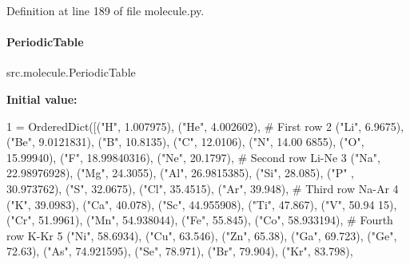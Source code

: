 Definition at line 189 of file molecule.\+py.

\mbox{\label{namespacesrc_1_1molecule_a9104a499383cefd53789d767a08472b3}} 
\paragraph{\texorpdfstring{Periodic\+Table}{PeriodicTable}}
{\footnotesize\ttfamily src.\+molecule.\+Periodic\+Table}

{\bfseries Initial value\+:}
\begin{DoxyCode}
1 =  OrderedDict([(\textcolor{stringliteral}{"H"}, 1.007975), (\textcolor{stringliteral}{"He"}, 4.002602), \textcolor{comment}{# First row}
2                              (\textcolor{stringliteral}{"Li"}, 6.9675), (\textcolor{stringliteral}{"Be"}, 9.0121831), (\textcolor{stringliteral}{"B"}, 10.8135), (\textcolor{stringliteral}{"C"}, 12.0106), (\textcolor{stringliteral}{"N"}, 14.00
      6855), (\textcolor{stringliteral}{"O"}, 15.99940), (\textcolor{stringliteral}{"F"}, 18.99840316), (\textcolor{stringliteral}{"Ne"}, 20.1797), \textcolor{comment}{# Second row Li-Ne}
3                              (\textcolor{stringliteral}{"Na"}, 22.98976928), (\textcolor{stringliteral}{"Mg"}, 24.3055), (\textcolor{stringliteral}{"Al"}, 26.9815385), (\textcolor{stringliteral}{"Si"}, 28.085), (\textcolor{stringliteral}{"P"}
      , 30.973762), (\textcolor{stringliteral}{"S"}, 32.0675), (\textcolor{stringliteral}{"Cl"}, 35.4515), (\textcolor{stringliteral}{"Ar"}, 39.948), \textcolor{comment}{# Third row Na-Ar}
4                              (\textcolor{stringliteral}{"K"}, 39.0983), (\textcolor{stringliteral}{"Ca"}, 40.078), (\textcolor{stringliteral}{"Sc"}, 44.955908), (\textcolor{stringliteral}{"Ti"}, 47.867), (\textcolor{stringliteral}{"V"}, 50.94
      15), (\textcolor{stringliteral}{"Cr"}, 51.9961), (\textcolor{stringliteral}{"Mn"}, 54.938044), (\textcolor{stringliteral}{"Fe"}, 55.845), (\textcolor{stringliteral}{"Co"}, 58.933194), \textcolor{comment}{# Fourth row K-Kr}
5                              (\textcolor{stringliteral}{"Ni"}, 58.6934), (\textcolor{stringliteral}{"Cu"}, 63.546), (\textcolor{stringliteral}{"Zn"}, 65.38), (\textcolor{stringliteral}{"Ga"}, 69.723), (\textcolor{stringliteral}{"Ge"}, 72.63),
       (\textcolor{stringliteral}{"As"}, 74.921595), (\textcolor{stringliteral}{"Se"}, 78.971), (\textcolor{stringliteral}{"Br"}, 79.904), (\textcolor{stringliteral}{"Kr"}, 83.798),

\end{DoxyCode}
